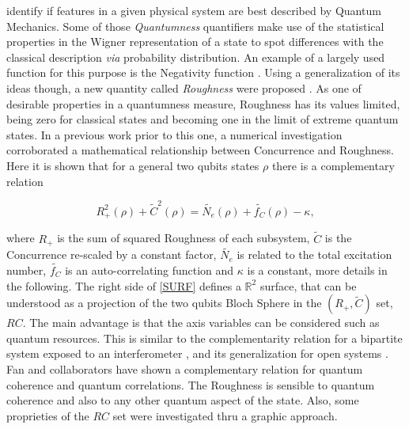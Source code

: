 \documentclass[aps,prl,preprint]{revtex4-1}
\begin{document}
	identify if features in a given
	physical system are best described by Quantum Mechanics.
	Some of those {\em Quantumness} quantifiers make use of the statistical properties
	in the Wigner representation of a state to spot differences with the classical
	description {\em via} probability distribution. An example of a largely used function for this purpose is the Negativity function \cite{NEG}. Using a generalization of its ideas though, 
	a new quantity called {\em Roughness} were proposed \cite{Lemos2018}. 
	As one of desirable properties in a quantumness measure, 
	Roughness has its values limited, being zero for classical states
	and becoming one in the limit of extreme quantum states. 
	In a previous work \cite{Reis2018} prior to this one, a numerical investigation corroborated a mathematical relationship between Concurrence and Roughness. 
	Here it is shown that for a general two qubits states $\rho$ there is a complementary relation 
	
	\begin{equation}
	R_+^2(\rho) + \tilde{C}^2(\rho)=
	\tilde{N_e}(\rho) + \tilde{f_C}(\rho) - \kappa,
	\label{SURF}
	\end{equation}
	
	where $R_+$ is the sum of squared Roughness of each subsystem,
	$\tilde{C}$ is the Concurrence 
	re-scaled by a constant factor, $\tilde{N_e}$ is related to the total excitation number, $\tilde{f_C}$ is an auto-correlating function and $\kappa$ is a constant, more details in the following.  The right side of \ref{SURF} defines a $\mathbb{R}^2$ surface, that can be understood as a projection of the two qubits Bloch Sphere \cite{Remy} in the $(R_+,\tilde{C})$ set, $RC$. The main advantage is that the axis variables can be considered such as quantum resources. This is similar to the complementarity relation for a bipartite system exposed to an interferometer \cite{Jakob}, and its generalization for open systems \cite{Karen,JGJ}. Fan and collaborators \cite{Fan} have shown a complementary relation for quantum coherence and quantum correlations. The Roughness is sensible to quantum coherence and also to any other quantum aspect of the state.  Also, some proprieties of the $RC$ set were investigated thru a graphic approach.
	
\end{document}
